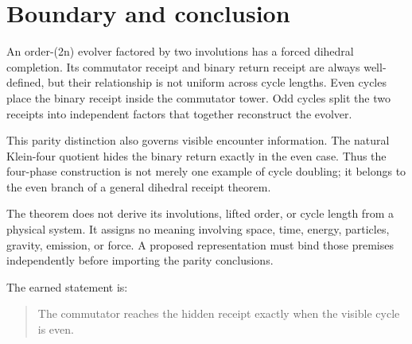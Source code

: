 \section{Boundary and conclusion}

An order-(2n) evolver factored by two involutions has a forced dihedral
completion. Its commutator receipt and binary return receipt are always
well-defined, but their relationship is not uniform across cycle lengths.
Even cycles place the binary receipt inside the commutator tower. Odd cycles
split the two receipts into independent factors that together reconstruct the
evolver.

This parity distinction also governs visible encounter information. The
natural Klein-four quotient hides the binary return exactly in the even case.
Thus the four-phase construction is not merely one example of cycle doubling;
it belongs to the even branch of a general dihedral receipt theorem.

The theorem does not derive its involutions, lifted order, or cycle length from
a physical system. It assigns no meaning involving space, time, energy,
particles, gravity, emission, or force. A proposed representation must bind
those premises independently before importing the parity conclusions.

The earned statement is:
\begin{quote}
The commutator reaches the hidden receipt exactly when the visible cycle is
even.
\end{quote}

